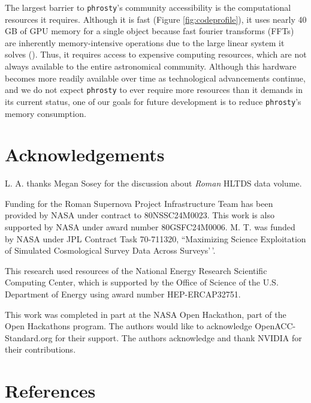 \documentclass[10pt,a4paper,onecolumn]{article}
\begin{document}
The largest barrier to \texttt{phrosty}'s community accessibility is the
computational resources it requires. Although it is fast (Figure
\ref{fig:codeprofile}), it uses nearly 40 GB of GPU memory for a single
object because fast fourier transforms (FFTs) are inherently
memory-intensive operations due to the large linear system it solves
(). Thus, it requires access to
expensive computing resources, which are not always available to the
entire astronomical community. Although this hardware becomes more
readily available over time as technological advancements continue, and
we do not expect \texttt{phrosty} to ever require more resources than it
demands in its current status, one of our goals for future development
is to reduce \texttt{phrosty}'s memory consumption.

\section{Acknowledgements}\label{acknowledgements}

L. A. thanks Megan Sosey for the discussion about \emph{Roman} HLTDS
data volume.

Funding for the Roman Supernova Project Infrastructure Team has been
provided by NASA under contract to 80NSSC24M0023. This work is also
supported by NASA under award number 80GSFC24M0006. M. T. was funded by
NASA under JPL Contract Task 70-711320, ``Maximizing Science
Exploitation of Simulated Cosmological Survey Data Across Surveys'\,'.

This research used resources of the National Energy Research Scientific
Computing Center, which is supported by the Office of Science of the
U.S. Department of Energy using award number HEP-ERCAP32751.

This work was completed in part at the NASA Open Hackathon, part of the
Open Hackathons program. The authors would like to acknowledge
OpenACC-Standard.org for their support. The authors acknowledge and
thank NVIDIA for their contributions.

\section*{References}\label{references}
\end{document}
